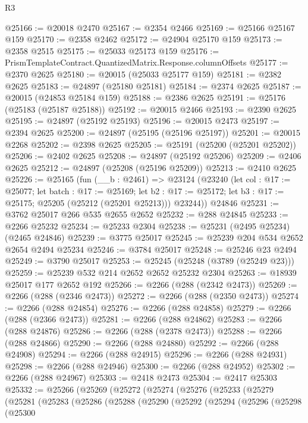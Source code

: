 \begin{lexlean}{R3}
\begin{coremodule}
@25166 := @20018 @2470
@25167 := @2354 @2466
@25169 := @25166 @25167 @159
@25170 := @2358 @2462
@25172 := @24904 @25170 @159
@25173 := @2358 @2515
@25175 := @25033 @25173 @159
@25176 := PrismTemplateContract.QuantizedMatrix.Response.columnOffsets
@25177 := @2370 @2625
@25180 := @20015 (@25033 @25177 @159)
@25181 := @2382 @2625
@25183 := @24897 (@25180 @25181)
@25184 := @2374 @2625
@25187 := @20015 (@24853 @25184 @159)
@25188 := @2386 @2625
@25191 := @25176 (@25183 (@25187 @25188))
@25192 := @20015 @2466
@25193 := @2390 @2625
@25195 := @24897 (@25192 @25193)
@25196 := @20015 @2473
@25197 := @2394 @2625
@25200 := @24897 (@25195 (@25196 @25197))
@25201 := @20015 @2268
@25202 := @2398 @2625
@25205 := @25191 (@25200 (@25201 @25202))
@25206 := @2402 @2625
@25208 := @24897 (@25192 @25206)
@25209 := @2406 @2625
@25212 := @24897 (@25208 (@25196 @25209))
@25213 := @2410 @2625
@25226 := @25165
    (fun (__b : @2461) =>
    @23124
      (@23240
        (let col : @17 := @25077;
        let batch : @17 := @25169;
        let b2 : @17 := @25172; let b3 : @17 := @25175; @25205 (@25212 (@25201 @25213)))
        @23244))
    @24846
@25231 := @3762 @25017 @266 @535 @2655 @2652
@25232 := @288 @24845
@25233 := @2266 @25232
@25234 := @25233 @2304
@25238 := @25231 (@2495 @25234) (@2465 @24846)
@25239 := @3775 @25017
@25245 := @25239 @204 @534 @2652 @2654 @2494 @25234
@25246 := @3784 @25017
@25248 := @25246 @23 @2494
@25249 := @3790 @25017
@25253 := @25245 (@25248 (@3789 (@25249 @23)))
@25259 := @25239 @532 @214 @2652 @2652 @25232 @2304
@25263 := @18939 @25017 @177 @2652 @192
@25266 := @2266 (@288 (@2342 @2473))
@25269 := @2266 (@288 (@2346 @2473))
@25272 := @2266 (@288 (@2350 @2473))
@25274 := @2266 (@288 @24854)
@25276 := @2266 (@288 @24858)
@25279 := @2266 (@288 (@2366 @2473))
@25281 := @2266 (@288 @24862)
@25283 := @2266 (@288 @24876)
@25286 := @2266 (@288 (@2378 @2473))
@25288 := @2266 (@288 @24866)
@25290 := @2266 (@288 @24880)
@25292 := @2266 (@288 @24908)
@25294 := @2266 (@288 @24915)
@25296 := @2266 (@288 @24931)
@25298 := @2266 (@288 @24946)
@25300 := @2266 (@288 @24952)
@25302 := @2266 (@288 @24967)
@25303 := @2418 @2473
@25304 := @2417 @25303
@25332 := @25266
    (@25269
      (@25272
        (@25274
          (@25276
            (@25233
              (@25279
                (@25281
                  (@25283
                    (@25286
                      (@25288
                        (@25290
                          (@25292
                            (@25294
                              (@25296
                                (@25298
                                  (@25300

\end{coremodule}
\end{lexlean}
